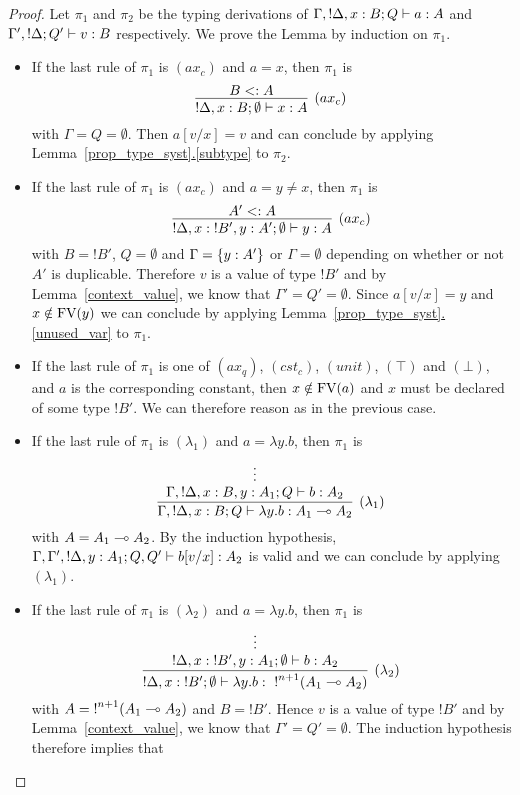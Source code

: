 \documentclass[twoside]{article}
\begin{document}
\begin{proof}
Let $\pi_1$ and $\pi_2$ be the typing derivations  of 
$\Gamma,{!}\Delta,x:B;Q \vdash a:A$ and  $\Gamma',{!}\Delta;Q' \vdash v:B$ 
respectively. We prove the Lemma by induction on $\pi_1$.
\begin{itemize}
 \item If the last rule of $\pi_1$ is $(ax_c)$ and $a=x$, then $\pi_1$ is
 \[
   \infer[(ax_c)]{{!}\Delta, x:B;\emptyset\entails x:A}{
     B<:A
   }
 \]
 with $\Gamma=Q=\emptyset$. Then $a[v/x]=v$ and can conclude by applying 
 Lemma~\hyperref[subtype]{\ref*{prop_type_syst}.\ref*{subtype}} to $\pi_2$.
 \item If the last rule of $\pi_1$ is $(ax_c)$ and $a=y\neq x$, then 
 $\pi_1$ is
 \[
   \infer[(ax_c)]{{!}\Delta, x:{!}B',y:A';\emptyset\entails y:A}{
     A'<:A
   }
 \]
 with $B={!}B'$, $Q=\emptyset$ and $\Gamma =\{y:A'\}$ or $\Gamma=\emptyset$ 
 depending on whether or not $A'$ is duplicable. Therefore $v$ is a value of 
 type ${!}B'$ and by Lemma~\hyperref[context_value]{\ref*{context_value}}, 
 we know that $\Gamma'=Q'=\emptyset$. Since $a[v/x]=y$ and $x\notin \mathop{\textrm{FV}}\nolimits(y)$ 
 we can conclude by applying
 Lemma~\hyperref[unused_var]{\ref*{prop_type_syst}.\ref*{unused_var}} to $\pi_1$.
 \item If the last rule of $\pi_1$ is one of $(ax_q)$, $(cst_c)$, 
 $(unit)$, $(\top)$ and $(\bot)$, and $a$ is the corresponding constant, 
 then $x\notin \mathop{\textrm{FV}}\nolimits(a)$ and  $x$ must be declared of some type ${!}B'$.
 We can therefore reason as in the previous case. 
 \item If the last rule of $\pi_1$ is $(\lambda_1)$ and $a=\lambda y.b$, then $\pi_1$ is
  \[
   \infer[(\lambda_1)]{\Gamma,{!}\Delta,x:B;Q\entails \lambda y.b:A_1\loli A_2}{
     \deduce[]{\Gamma, {!}\Delta,x:B,y:A_1;Q \entails b:A_2}{
       \vdots
     }
   }
 \]
 with $A=A_1\multimap A_2$. By the induction hypothesis, 
 $\Gamma, \Gamma',{!}\Delta,y:A_1;Q,Q' \vdash b[v/x]:A_2$ is valid and we can conclude
 by applying $(\lambda_1)$.
 \item If the last rule of $\pi_1$ is $(\lambda_2)$ and $a=\lambda y.b$, 
 then $\pi_1$ is
 \[
  \infer[(\lambda_2)]{{!}\Delta, x:{!}B';\emptyset \entails \lambda y.b:~{!}^{n+1}(A_1\loli A_2)}{
    \deduce[]{{!}\Delta, x:{!}B',y:A_1;\emptyset \entails b:A_2}{
      \vdots
    }
  }
 \]
 with $A={!}^{n+1}(A_1\multimap A_2)$ and $B={!}B'$. Hence $v$ is a value of type ${!}B'$ and  
 by Lemma~\hyperref[context_value]{\ref*{context_value}}, we know that
 $\Gamma'=Q'=\emptyset$. The induction hypothesis therefore implies that

\end{itemize}
\end{proof}
\end{document}
